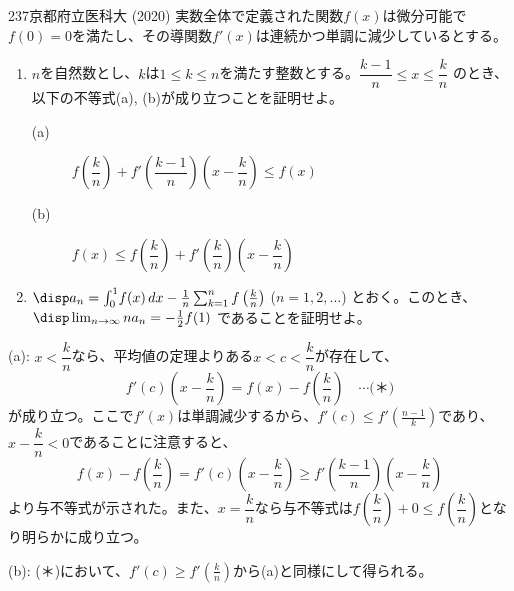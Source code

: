 \begin{thm}{237}{}{京都府立医科大 (2020)}
 実数全体で定義された関数$f(x)$は微分可能で $f(0)=0$を満たし、その導関数$f'(x)$は連続かつ単調に減少しているとする。
 \begin{enumerate}
  \item $n$を自然数とし、$k$は$1\le k\le n$を満たす整数とする。$\dfrac{k-1}{n}\le x\le\dfrac{k}{n}$ のとき、以下の不等式(a), (b)が成り立つことを証明せよ。
  \begin{description}
   \item[(a)] $f\left(\dfrac{k}{n}\right)+f'\left(\dfrac{k-1}{n}\right)\left(x-\dfrac{k}{n}\right)\le f(x)$
   \item[(b)] $f(x)\le f\left(\dfrac{k}{n}\right)+f'\left(\dfrac{k}{n}\right)\left(x-\dfrac{k}{n}\right)$
  \end{description}
  \item $\disp a_n=\int_0^1\!f(x) \,dx-\frac{1}{n}\sum_{k=1}^nf\left(\frac{k}{n}\right)$ ($n=1,2,\dots$) とおく。このとき、$\disp \lim_{n\to\infty} na_n=-\frac{1}{2}f(1)$ であることを証明せよ。
 \end{enumerate}
\end{thm}

(a): $x<\dfrac{k}{n}$なら、平均値の定理よりある$x<c<\dfrac{k}{n}$が存在して、
\[ f'(c)\left(x-\frac{k}{n}\right)=f(x)-f(\frac{k}{n}) \quad\cdots\text{(＊)} \]
が成り立つ。ここで$f'(x)$は単調減少するから、$f'(c)\le f'(\frac{n-1}{k})$であり、$x-\dfrac{k}{n}<0$であることに注意すると、
\[ f(x)-f(\frac{k}{n})=f'(c)\left(x-\frac{k}{n}\right)\ge f'\left(\frac{k-1}{n}\right)\left(x-\frac{k}{n}\right) \]
より与不等式が示された。また、$x=\dfrac{k}{n}$なら与不等式は$f\left(\dfrac{k}{n}\right)+0\le f\left(\dfrac{k}{n}\right)$となり明らかに成り立つ。

(b): (＊)において、$f'(c)\ge f'(\frac{k}{n})$から(a)と同様にして得られる。

